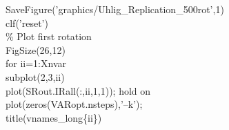 \hspace{1mm}\hspace{5mm} \hspace{5mm} \hspace{5mm} SaveFigure(\textcolor{matlabpurple}{'graphics/Uhlig\_Replication\_500rot'},1) \\ 
\hspace{1mm}\hspace{5mm} \hspace{5mm} \hspace{5mm} clf(\textcolor{matlabpurple}{'reset'}) \\ 
\hspace{1mm}\hspace{5mm} \hspace{5mm} \hspace{5mm} \textcolor{matlabgreen}{\% Plot first rotation }\\ 
\hspace{1mm}\hspace{5mm} \hspace{5mm} \hspace{5mm} FigSize(26,12) \\ 
\hspace{1mm}\hspace{5mm} \hspace{5mm} \hspace{5mm} \textcolor{matlabblue}{for} ii=1:Xnvar \\ 
\hspace{1mm}\hspace{5mm} \hspace{5mm} \hspace{5mm} \hspace{5mm} subplot(2,3,ii) \\ 
\hspace{1mm}\hspace{5mm} \hspace{5mm} \hspace{5mm} \hspace{5mm} plot(SRout.IRall(:,ii,1,1)); hold on \\ 
\hspace{1mm}\hspace{5mm} \hspace{5mm} \hspace{5mm} \hspace{5mm} plot(zeros(VARopt.nsteps),\textcolor{matlabpurple}{'--k'}); \\ 
\hspace{1mm}\hspace{5mm} \hspace{5mm} \hspace{5mm} \hspace{5mm} title(vnames\_long\{ii\}) \\ 

